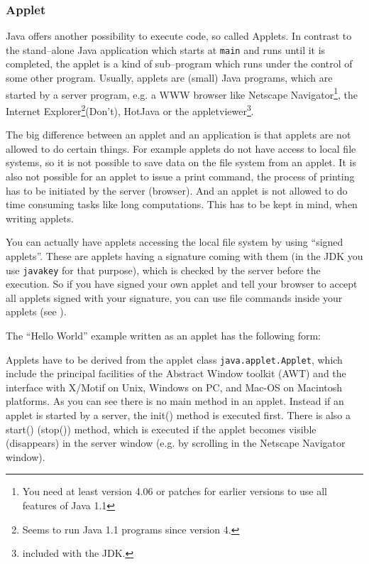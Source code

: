 \subsubsection{Applet}
\label{sec:Applet}

Java offers another possibility to execute code, so called Applets.
In contrast to the stand--alone Java application which starts at
\verb!main! and runs until it is completed, the applet is a kind of
sub--program which runs under the control of some other program.
Usually, applets are (small) Java programs, which are started by a 
server program,
e.g. a WWW browser like Netscape Navigator\footnote{You need at least 
version 4.06 or patches for earlier versions to use all features of Java 1.1}, 
the Internet Explorer\footnote{Seems to run Java 1.1 programs since
version 4.}(Don't),
HotJava or the appletviewer\footnote{included with the JDK.}.

The big difference between an applet and an application is that
applets are not allowed to do certain things. For example applets
do not have access to local file systems, so it is not possible
to save data on the file system from an applet. It is also not
possible for an applet to issue a print command, the process of
printing has to be initiated by the server (browser). 
And an applet is not allowed to do time consuming tasks like
long computations. This has to be kept in mind, when writing
applets.

You can actually have applets accessing the local file system by using
``signed applets''. These are applets having a signature coming
with them (in the JDK you use \verb|javakey| for that purpose), 
which is checked by the server before the execution. So
if you have signed your own applet and tell your browser to accept 
all applets signed with your signature, you can use file commands
inside your applets (see \cite[page 142]{javanutshell}).

The ``Hello World'' example written as an applet has the following form:

Applets have to be derived from the applet class
\verb|java.applet.Applet|, which include the principal facilities of
the Abstract Window toolkit (AWT) and the interface with X/Motif on
Unix, Windows on PC, and Mac-OS on Macintosh platforms.
As you can see there is no main method in an applet. Instead if an applet
is started by a server, the init() method is executed first. There is also
a start() (stop()) method, which is executed if the applet becomes
visible (disappears) in the server window (e.g. by scrolling in the
Netscape Navigator window).

